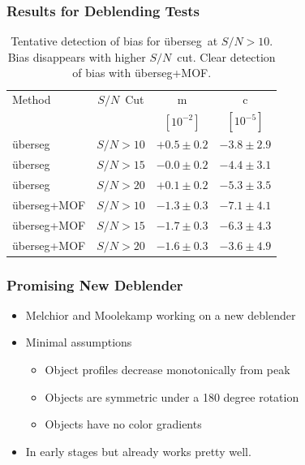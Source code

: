 \documentclass{beamer}
\newcommand{\snr}{$S/N$}
\newcommand{\uberseg}{{\"u}berseg}
\begin{document}
\frame
{

    \frametitle{Results for Deblending Tests}

\begin{table}
    \centering
    \begin{tabular}{|l|c|c|c|}
        \hline
        Method         & \snr\ Cut & m            & c            \\
                       &           & $[10^{-2}]$  & $[10^{-5}]$  \\
        \hline

		\hline
        \uberseg       & \snr$ > 10$ & $+0.5 \pm 0.2$  & $-3.8 \pm 2.9$ \\
        \uberseg       & \snr$ > 15$ & $-0.0 \pm 0.2$  & $-4.4 \pm 3.1$ \\
        \uberseg       & \snr$ > 20$ & $+0.1 \pm 0.2$  & $-5.3 \pm 3.5$ \\

        \hline
        \uberseg+MOF   & \snr$ > 10$ & $-1.3 \pm 0.3$ & $-7.1 \pm 4.1$ \\
        \uberseg+MOF   & \snr$ > 15$ & $-1.7 \pm 0.3$ & $-6.3 \pm 4.3$ \\
        \uberseg+MOF   & \snr$ > 20$ & $-1.6 \pm 0.3$ & $-3.6 \pm 4.9$ \\


		\hline
    \end{tabular}
    \caption{Tentative detection of bias for \uberseg\ at \snr$>10$.
    Bias disappears with higher \snr\ cut.
    Clear detection of bias with \uberseg+MOF.
     \label{tab:mcal:deblending}}
\end{table}


}

\frame
{

    \frametitle{Promising New Deblender}

 

    \begin{itemize}

        \item Melchior and Moolekamp working on a new
            deblender

        \item Minimal assumptions
            \begin{itemize}
                \item Object profiles decrease monotonically from peak
                \item Objects are symmetric under a 180 degree rotation
                \item Objects have no color gradients
            \end{itemize}

        \item In early stages but already works pretty well.
    \end{itemize}


}
\end{document}
